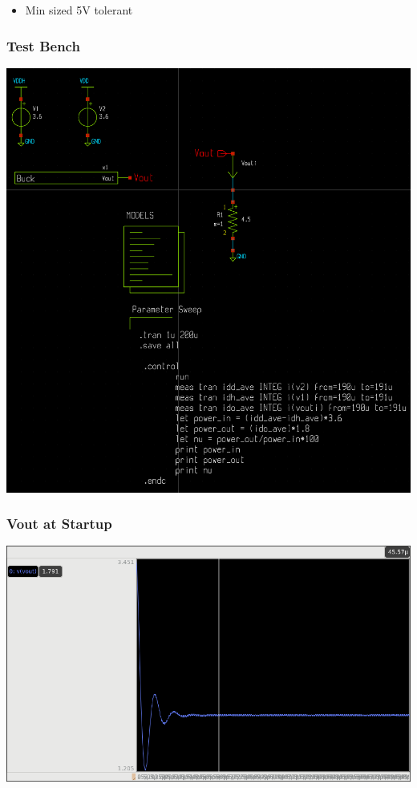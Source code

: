 \documentclass{beamer}
\begin{document}
\begin{frame}
\begin{multicols}{2}
  \end{multicols}
  \begin{itemize}
  \item Min sized 5V tolerant
  \end{itemize}
\end{frame}

\begin{frame}
  \frametitle{Test Bench}
  \includegraphics[scale=0.10]{testbench.png}
\end{frame}

\begin{frame}
  \frametitle{Vout at Startup }
  \includegraphics[scale=0.25]{startup-to-steady.png}
\end{frame}
\end{document}
